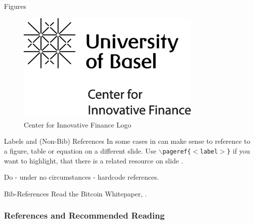 \documentclass[]{beamer}
\begin{document}
\begin{frame}{Figures}
	\begin{figure}
		\center
		\includegraphics[width=0.8\textwidth]{../config/logo_cif}	
		\caption{Center for Innovative Finance Logo}
		\label{fig:logo}
	\end{figure}
\end{frame}


\begin{frame}{Labels and (Non-Bib) References}
	In some cases in can make sense to reference to a figure, table or equation on a different slide. Use \texttt{$\backslash$pageref\{$<$label$>$\}} if you want to highlight, that there is a related resource on slide \pageref{fig:logo}.\\ \vspace{1em}
	
	Do - under no circumstances - hardcode references.	
\end{frame}


\begin{frame}{Bib-References}
		Read the Bitcoin Whitepaper, \cite{nakamotoBitcoin2008}.
\end{frame}


\begin{frame}%
\frametitle{References and Recommended Reading}
	
	
\end{frame}
\end{document}
